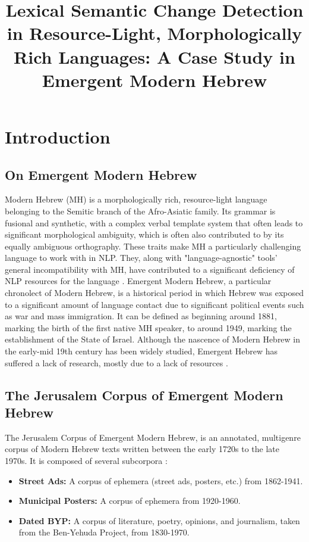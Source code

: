 \documentclass[10pt, a4paper]{article}
\title{\vspace*{.5\baselineskip} \textbf{Lexical Semantic Change Detection in Resource-Light, Morphologically Rich Languages: A Case Study in Emergent Modern Hebrew}}
\begin{document}
\maketitleabstract

\section{Introduction}

\subsection{On Emergent Modern Hebrew}
Modern Hebrew (MH) is a morphologically rich, resource-light language belonging to the Semitic branch of the Afro-Asiatic family. Its grammar is fusional and synthetic, with a complex verbal template system that often leads to significant morphological ambiguity, which is often also contributed to by its equally ambiguous orthography.
These traits make MH a particularly challenging language to work with in NLP. They, along with "language-agnostic" tools' general incompatibility with MH, have contributed to a significant deficiency of NLP resources for the language \cite{tsarfaty2019whats}.
Emergent Modern Hebrew, a particular chronolect of Modern Hebrew, is a historical period in which Hebrew was exposed to a significant amount of language contact due to significant political events such as war and mass immigration. It can be defined as beginning around 1881, marking the birth of the first native MH speaker, to around 1949, marking the establishment of the State of Israel. Although the nascence of Modern Hebrew in the early-mid 19th century has been widely studied, Emergent Hebrew has suffered a lack of research, mostly due to a lack of resources \cite{Rubinstein2019}.

\subsection{The Jerusalem Corpus of Emergent Modern Hebrew}
The Jerusalem Corpus of Emergent Modern Hebrew, is an annotated, multigenre corpus of Modern Hebrew texts written between the early 1720s to the late 1970s. It is composed of several subcorpora \cite{Rubinstein2019}:
\begin{itemize}
    \item \textbf{Street Ads:} A corpus of ephemera (street ads, posters, etc.) from 1862-1941.
    \item \textbf{Municipal Posters:} A corpus of ephemera from 1920-1960.
    \item \textbf{Dated BYP:} A corpus of literature, poetry, opinions, and journalism, taken from the Ben-Yehuda Project, from 1830-1970.
\end{itemize}
\end{document}
